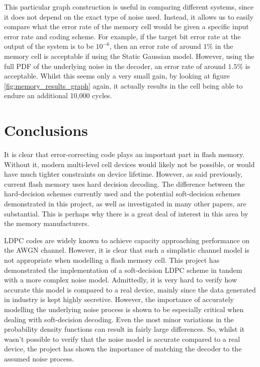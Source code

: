 \documentclass[11pt]{article}
\numberwithin{equation}{subsection}
\begin{document}
This particular graph construction is useful in comparing different systems, since it does not depend on the exact type of noise used. Instead, it allows us to easily compare what the error rate of the memory cell would be given a specific input error rate and coding scheme. For example, if the target bit error rate at the output of the system is to be $10^{-6}$, then an error rate of around $1\%$ in the memory cell is acceptable if using the Static Gaussian model. However, using the full PDF of the underlying noise in the decoder, an error rate of around $1.5\%$ is acceptable. Whilst this seems only a very small gain, by looking at figure \ref{fig:memory_results_graph} again, it actually results in the cell being able to endure an additional 10,000 cycles.

\section{Conclusions}
It is clear that error-correcting code plays an important part in flash memory. Without it, modern multi-level cell devices would likely not be possible, or would have much tighter constraints on device lifetime. However, as said previously, current flash memory uses hard decision decoding. The difference between the hard-decision schemes currently used and the potential soft-decision schemes demonstrated in this project, as well as investigated in many other papers, are substantial. This is perhaps why there is a great deal of interest in this area by the memory manufacturers. 

LDPC codes are widely known to achieve capacity approaching performance on the AWGN channel. However, it is clear that such a simplistic channel model is not appropriate when modelling a flash memory cell. This project has demonstrated the implementation of a soft-decision LDPC scheme in tandem with a more complex noise model. Admittedly, it is very hard to verify how accurate this model is compared to a real device, mainly since the data generated in industry is kept highly secretive. However, the importance of accurately modelling the underlying noise process is shown to be especially critical when dealing with soft-decision decoding. Even the most minor variations in the probability density functions can result in fairly large differences. So, whilst it wasn't possible to verify that the noise model is accurate compared to a real device, the project has shown the importance of matching the decoder to the assumed noise process.
\end{document}

